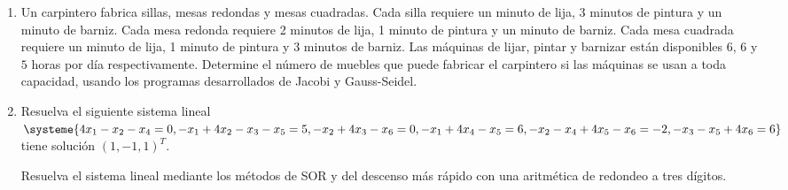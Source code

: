\documentclass[
	spanish,
	8pt,
	utf8,
	xcolor=table,
	handout,
	aspectratio=169,
	professionalfonts,
	notheorems,
	mathserif,
]{beamer}
\newcounter{savedenum}
\newcommand*{\saveenum}{\setcounter{savedenum}{\theenumi}}
\newcommand*{\resume}{\setcounter{enumi}{\thesavedenum}}
\begin{document}
\begin{frame}
	\begin{enumerate}
		\resume
		\item

		      Un carpintero fabrica sillas, mesas redondas y mesas
		      cuadradas.
		      Cada silla requiere un minuto de lija, 3 minutos de pintura
		      y un minuto de barniz.
		      Cada mesa redonda requiere 2 minutos de lija, 1 minuto de
		      pintura y un minuto de barniz.
		      Cada mesa cuadrada requiere un minuto de lija, 1 minuto de
		      pintura y 3 minutos de barniz.
		      Las máquinas de lijar, pintar y barnizar están disponibles
		      $6$, $6$ y $5$ horas por día respectivamente.
		      Determine el número de muebles que puede fabricar el
		      carpintero si las máquinas se usan a toda capacidad, usando
		      los programas desarrollados de Jacobi y Gauss-Seidel.

		\item

		      Resuelva el siguiente sistema lineal
		      \begin{math}
			      \systeme{
			      4x_{1}-
			      x_{2}-
			      x_{4}=
			      0,
			      -x_{1}+
			      4x_{2}-
			      x_{3}-
			      x_{5}=
			      5,
			      -x_{2}+
			      4x_{3}-
			      x_{6}=
			      0,
			      -x_{1}+
			      4x_{4}-
			      x_{5}=
			      6,
			      -x_{2}-
			      x_{4}+
			      4x_{5}-
			      x_{6}=
			      -2,
			      -x_{3}-
			      x_{5}+
			      4x_{6}=
			      6
			      }
		      \end{math}
		      tiene solución ${\left(1,-1,1\right)}^{T}$.

		      Resuelva el sistema lineal mediante los métodos de SOR y
		      del descenso más rápido con una aritmética de redondeo a
		      tres dígitos.
		      \saveenum
	\end{enumerate}
\end{frame}
\end{document}
